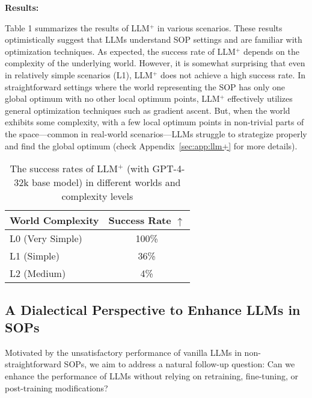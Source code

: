 \textbf{Results:}

Table 1 summarizes the results of LLM$^+$ in various scenarios. These results optimistically suggest that LLMs understand SOP settings and are familiar with optimization techniques. As expected, the success rate of LLM$^+$ depends on the complexity of the underlying world. However, it is somewhat surprising that even in relatively simple scenarios (L1), LLM$^+$ does not achieve a high success rate. In straightforward settings where the world representing the SOP has only one global optimum with no other local optimum points, LLM$^+$ effectively utilizes general optimization techniques such as gradient ascent. But, when the world exhibits some complexity, with a few local optimum points in non-trivial parts of the space—common in real-world scenarios—LLMs struggle to strategize properly and find the global optimum (check Appendix~\ref{sec:app:llm+} for more details).

\begin{table}[t]
\caption{The success rates of LLM$^+$ (with GPT-4-32k base model) in different worlds and complexity levels}
\label{table:primary_results}
\begin{center}
\begin{small}
\begin{sc}
\begin{tabular}{l|c}
\toprule
World Complexity & Success Rate $\uparrow$\\
\hline
L0 (Very Simple) & 100\% \\
L1 (Simple) & 36\% \\
L2 (Medium) & 4\% \\

\bottomrule
\end{tabular}
\end{sc}
\end{small}
\end{center}
\vskip -0.3in
\end{table}


\subsection{A Dialectical Perspective to Enhance LLMs in SOPs}
\label{sec:part_3_ace}


Motivated by the unsatisfactory performance of vanilla LLMs in non-straightforward SOPs, we aim to address a natural follow-up question: Can we enhance the performance of LLMs without relying on retraining, fine-tuning, or post-training modifications? 

